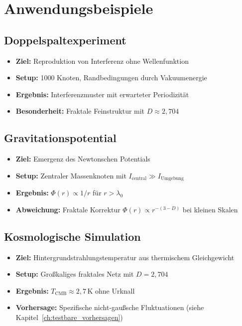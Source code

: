 \section{Anwendungsbeispiele}
\label{app:numerik_beispiele}

\subsection{Doppelspaltexperiment}
\label{sub:numerik_doppelspalt}

\begin{itemize}
    \item \textbf{Ziel:} Reproduktion von Interferenz ohne Wellenfunktion
    \item \textbf{Setup:} 1000 Knoten, Randbedingungen durch Vakuumenergie
    \item \textbf{Ergebnis:} Interferenzmuster mit erwarteter Periodizität
    \item \textbf{Besonderheit:} Fraktale Feinstruktur mit \( D \approx 2,704 \)
\end{itemize}

\subsection{Gravitationspotential}
\label{sub:numerik_gravitation}

\begin{itemize}
    \item \textbf{Ziel:} Emergenz des Newtonschen Potentials
    \item \textbf{Setup:} Zentraler Massenknoten mit \( I_{\text{central}} \gg I_{\text{Umgebung}} \)
    \item \textbf{Ergebnis:} \( \Phi(r) \propto 1/r \) für \( r > \lambda_0 \)
    \item \textbf{Abweichung:} Fraktale Korrektur \( \Phi(r) \propto r^{-(3-D)} \) bei kleinen Skalen
\end{itemize}

\subsection{Kosmologische Simulation}
\label{sub:numerik_kosmologie}

\begin{itemize}
    \item \textbf{Ziel:} Hintergrundstrahlungstemperatur aus thermischem Gleichgewicht
    \item \textbf{Setup:} Großkaliges fraktales Netz mit \( D = 2,704 \)
    \item \textbf{Ergebnis:} \( T_{\text{CMB}} \approx 2,7 \, \text{K} \) ohne Urknall
    \item \textbf{Vorhersage:} Spezifische nicht-gaußsche Fluktuationen (siehe Kapitel~\ref{ch:testbare_vorhersagen})
\end{itemize}

